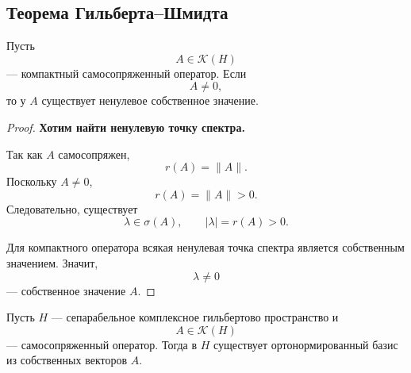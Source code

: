 \subsection{Теорема Гильберта--Шмидта}

\begin{lemma}
	Пусть
	\[
	A\in\mathcal K(H)
	\]
	--- компактный самосопряженный оператор. Если
	\[
	A\neq0,
	\]
	то у \(A\) существует ненулевое собственное значение.
\end{lemma}

\begin{proof}
	\textbf{Хотим найти ненулевую точку спектра.}
	
	Так как \(A\) самосопряжен,
	\[
	r(A)=\|A\|.
	\]
	Поскольку \(A\neq0\),
	\[
	r(A)=\|A\|>0.
	\]
	Следовательно, существует
	\[
	\lambda\in\sigma(A),
	\qquad
	|\lambda|=r(A)>0.
	\]
	
	Для компактного оператора всякая ненулевая точка спектра является
	собственным значением. Значит,
	\[
	\lambda\neq0
	\]
	--- собственное значение \(A\).
\end{proof}

\begin{theorem}
	Пусть \(H\) --- сепарабельное комплексное гильбертово пространство и
	\[
	A\in\mathcal K(H)
	\]
	--- самосопряженный оператор. Тогда в \(H\) существует ортонормированный
	базис из собственных векторов \(A\).
\end{theorem}

